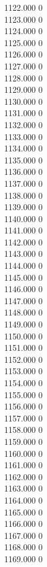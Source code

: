{ 1122.000	0 \\
 1123.000	0 \\
 1124.000	0 \\
 1125.000	0 \\
 1126.000	0 \\
 1127.000	0 \\
 1128.000	0 \\
 1129.000	0 \\
 1130.000	0 \\
 1131.000	0 \\
 1132.000	0 \\
 1133.000	0 \\
 1134.000	0 \\
 1135.000	0 \\
 1136.000	0 \\
 1137.000	0 \\
 1138.000	0 \\
 1139.000	0 \\
 1140.000	0 \\
 1141.000	0 \\
 1142.000	0 \\
 1143.000	0 \\
 1144.000	0 \\
 1145.000	0 \\
 1146.000	0 \\
 1147.000	0 \\
 1148.000	0 \\
 1149.000	0 \\
 1150.000	0 \\
 1151.000	0 \\
 1152.000	0 \\
 1153.000	0 \\
 1154.000	0 \\
 1155.000	0 \\
 1156.000	0 \\
 1157.000	0 \\
 1158.000	0 \\
 1159.000	0 \\
 1160.000	0 \\
 1161.000	0 \\
 1162.000	0 \\
 1163.000	0 \\
 1164.000	0 \\
 1165.000	0 \\
 1166.000	0 \\
 1167.000	0 \\
 1168.000	0 \\
 1169.000	0 \\
}
